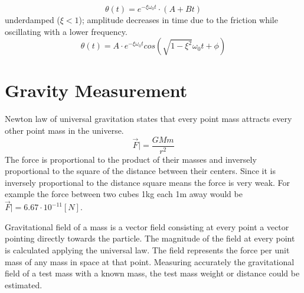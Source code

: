 \documentclass[\main/master.tex]{subfiles}
\begin{document}
\begin{equation}
\theta(t) = e^{-\xi\omega_0 t}\cdot(A+Bt)     \label{eqn:underdamped_motion_equation}
\end{equation}
 underdamped ($\xi < 1$); amplitude decreases in time due to the friction while oscillating with a lower frequency.
\begin{equation}
\theta(t) = A\cdot e^{-\xi\omega_0 t}cos(\sqrt{1-\xi^2}\omega_0 t +\phi)    \label{eqn:underdamped_motion_equation}
\end{equation}

\iffalse
https://ocw.mit.edu/courses/mathematics/18-03sc-differential-equations-fall-2011/unit-ii-second-order-constant-coefficient-linear-equations/damped-harmonic-oscillators/MIT18_03SCF11_s13_2text.pdf

https://www.sciencedirect.com/topics/engineering/underdamped-system#:~:text=When%


\subsection{Driven Oscillator}
If the damped oscillator system is further affected by an external time-dependent tourqe $\tau(t)$,  the system is called driven oscillator.
\begin{equation}
\tau(t) -\kappa\cdot\theta - b\dot{\theta}  = I\cdot\ddot{\theta}   \label{eqn:driven_motion_equation}
\end{equation} 
\begin{equation}
\ddot{\theta} + 2\xi\omega_0\dot{\theta} + \omega_0^2\theta = \frac{\tau(t)}{I}   \label{eqn:damped_motion_equation}
\end{equation}
\fi

\section{Gravity Measurement}
Newton law of universal gravitation states that every point mass attracts every other point mass in the universe.
\begin{equation}
\overrightarrow{F}| = \frac{GMm}{r^2}   \label{eqn:universal_gravitation}
\end{equation} 
The force is proportional to the product of their masses and inversely proportional to the square of the distance between their centers. Since it is inversely proportional to the distance square means the force is very weak. For example the force between two cubes 1kg each 1m away would be $\overrightarrow{F}| = 6.67\cdot10^{-11}[N]$.
\par
Gravitational field of a mass is a vector field consisting at every point a vector pointing directly towards the particle. The magnitude of the field at every point is calculated applying the universal law. The field represents the force per unit mass of any mass in space at that point. Measuring accurately the gravitational field of a test mass with a known mass, the test mass weight or distance could be estimated.
\end{document}
